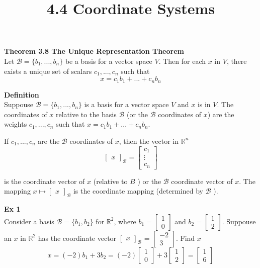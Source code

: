 \documentclass{article}
\title{4.4 Coordinate Systems}
\begin{document}
  \maketitle
  \textbf{Theorem 3.8 The Unique Representation Theorem}\\
  Let $ \mathcal{B}=\{ b_1,...,b_n \} $ be a basis for a vector space $ V $. Then for each $ x $ in $ V $, there exists a unique set of scalars $ c_1,...,c_n $ such that
  \[
    x=c_1b_1+...+c_nb_n
  \]

  \textbf{Definition}\\
  Suppouse $ \mathcal{B}=\{ b_1,...,b_n \} $ is a basis for a vector space $ V $ and $ x $ is in $ V $. The coordinates of $ x $ relative to the basis $ \mathcal{B} $ (or the $ \mathcal{B} $ coordinates of $ x$) are the weights $ c_1,...,c_n $ such that $ x=c_1b_1+...+c_nb_n $. 
  
  If $ c_1,...,c_n $ are the $ \mathcal{B} $ coordinates of $ x $, then the vector in $ \mathbb{R}^{n} $
  \[
    \begin{bmatrix}
      x
    \end{bmatrix}_\mathcal{B}=\begin{bmatrix}
      c_1\\
      \vdots\\
      c_n
    \end{bmatrix}
  \]

  is the coordinate vector of $ x $ (relative to $ B $ ) or the $ \mathcal{B} $ coordinate vector of $ x $. The mapping $ x \mapsto \begin{bmatrix}
    x
  \end{bmatrix}_\mathcal{B} $ is the coordinate mapping (determined by $ \mathcal{B} $ ).

  \textbf{Ex 1}\\
  Consider a basis $ \mathcal{B}=\{ b_1,b_2 \} $ for $ \mathbb{R}^{2} $, where $ b_1=\begin{bmatrix}
    1\\
    0
  \end{bmatrix} $ and $ b_2=\begin{bmatrix}
    1\\
    2
  \end{bmatrix} $. Suppouse an $ x $ in $ \mathbb{R}^{2} $ has the coordinate vector $\begin{bmatrix}
    x
  \end{bmatrix}_\mathcal{B} $ = $ \begin{bmatrix}
    -2\\
    3
  \end{bmatrix} $. Find $ x $ 
  \[
    x=(-2)b_1+3b_2=(-2)\begin{bmatrix}
      1\\
      0
    \end{bmatrix}+3\begin{bmatrix}
      1\\
      2
    \end{bmatrix}=\boxed{\begin{bmatrix}
      1\\
      6
  \end{bmatrix}}
  \]
\end{document}
